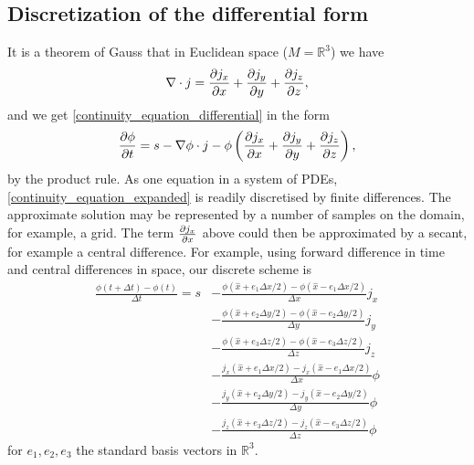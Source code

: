 \subsection{Discretization of the differential form}
It is a theorem of Gauss that in Euclidean space ($M = \mathbb{R}^3$) we have
\begin{equation}\label{gauss_euclidean_divergence}
    \nabla \cdot j = \frac{\partial j_x}{\partial x} + \frac{\partial j_y}{\partial y} + \frac{\partial j_z}{\partial z},
\end{equation}
and we get \eqref{continuity_equation_differential} in the form
\begin{equation}\label{continuity_equation_expanded}
    \frac{\partial \phi}{\partial t} = s - \nabla \phi \cdot j - \phi\left(\frac{\partial j_x}{\partial x} + \frac{\partial j_y}{\partial y} + \frac{\partial j_z}{\partial z}\right),
\end{equation}
by the product rule.
As one equation in a system of PDEs, \eqref{continuity_equation_expanded} is readily discretised by finite differences.
The approximate solution may be represented by a number of samples on the domain, for example, a grid. The term
$\frac{\partial j_x}{\partial x}$ above could then be approximated by a secant, for example a central difference.
For example, using forward difference in time and
central differences in space, our discrete scheme is
\begin{equation}\label{continuity_equation_finite_differences}
\begin{split}
    \frac{\phi(t + \Delta t) - \phi(t)}{\Delta t} = s &-\frac{\phi(\hat{x} + e_1\Delta x/2) - \phi(\hat{x} - e_1\Delta x/2)}{\Delta x}j_x \\
                                                      &-\frac{\phi(\hat{x} + e_2\Delta y/2) - \phi(\hat{x} - e_2\Delta y/2)}{\Delta y}j_y \\
                                                      &-\frac{\phi(\hat{x} + e_3\Delta z/2) - \phi(\hat{x} - e_3\Delta z/2)}{\Delta z}j_z \\
                                                      &-\frac{j_x(\hat{x} + e_1\Delta x/2) - j_x(\hat{x} - e_1\Delta x/2)}{\Delta x}\phi \\
                                                      &-\frac{j_y(\hat{x} + e_2\Delta y/2) - j_y(\hat{x} - e_2\Delta y/2)}{\Delta y}\phi \\
                                                      &-\frac{j_z(\hat{x} + e_3\Delta z/2) - j_z(\hat{x} - e_3\Delta z/2)}{\Delta z}\phi
\end{split}
\end{equation}
for $e_1,e_2,e_3$ the standard basis vectors in $\mathbb{R}^3$.

